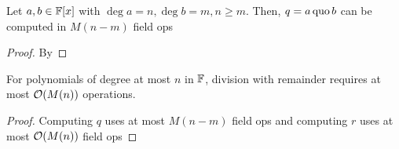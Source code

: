 \begin{corollary}{}{}
    Let $a, b \in \operatorname{\mathbb{F}}[x]$ with $\deg a = n, \deg b = m, n \geq m$. Then, $q = a \operatorname{quo} b$ can be computed in $M(n - m)$ field ops
\end{corollary}
\begin{proof}
    By 
\end{proof}

\begin{corollary}{}{}
    For polynomials of degree at most $n$ in $\operatorname{\mathbb{F}}$, division with remainder requires at most $\operatorname{\mathcal{O}}(M(n))$ operations.
\end{corollary}
\begin{proof}
    Computing $q$ uses at most $M(n - m)$ field ops and computing $r$ uses at most $\operatorname{\mathcal{O}}(M(n))$ field ops
\end{proof}

